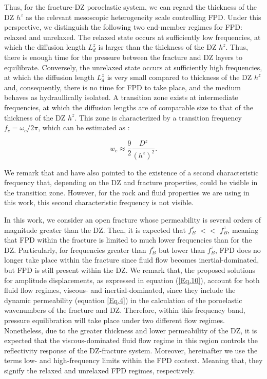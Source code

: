 \documentclass[draft]{agujournal2019}
\begin{document}
Thus, for the fracture-DZ poroelastic system, we can regard the thickness of the DZ $h^z$ as the relevant mesoscopic heterogeneity scale controlling FPD. Under this perspective, we  distinguish the following two end-member regimes for FPD: relaxed and unrelaxed. The relaxed state occurs at sufficiently low  frequencies, at which the diffusion length $L_d^z$ is larger than the thickness of the DZ $h^z$.
Thus, there is enough time for the pressure between the fracture and DZ layers to equilibrate. Conversely, the unrelaxed state occurs at sufficiently high frequencies, at which the diffusion length $L_d^z$ is very small compared to thickness of the DZ $h^z$ and, consequently, there is no time for FPD to take place, and the medium behaves as hydraullically isolated. A transition zone exists at intermediate frequencies, at which the diffusion lengths are of comparable size to that of the thickness of the DZ $h^z$. This zone is characterized by a transition frequency $f_c = \omega_c /2 \pi$, which can be estimated as \cite{Brajanovski2006, Muller2006}: 
\begin{linenomath*}
\begin{equation}\label{Eq.21}
   w_c \approx  \frac{9}{2} \frac{D^z}{(h^z)^2}.
\end{equation}
\end{linenomath*}
We remark that  and  have also pointed to the existence of a second characteristic frequency that, depending on the DZ and fracture properties, could be visible in the transition zone. However, 
for the rock and fluid properties we are using in this work, this second characteristic frequency is not visible.

In this work, we consider an open fracture whose permeability is several orders of magnitude greater than the DZ. Then, it is expected that $f_B^c$ $<<$ $f_B^z$, meaning that FPD within the fracture is limited to much lower frequencies than for the DZ. Particularly, for frequencies greater than $f_B^c$ but lower than $f_B^z$, FPD does no longer take place within the fracture since fluid flow becomes inertial-dominated, but FPD is still present within the DZ.  We remark that, the proposed solutions for amplitude displacements, as expressed in equation (\ref{Eq.10}), account for both fluid flow regimes, viscous- and inertial-dominated, since they include the dynamic permeability (equation \ref{Eq.4}) in the calculation of the poroelastic wavenumbers  of the fracture and DZ. Therefore,
within this frequency band, pressure equilibration will take place under two different flow regimes. Nonetheless, due to the greater thickness and lower permeability of the DZ, it is expected that the viscous-dominated fluid flow regime in this region controls the reflectivity response of the DZ-fracture system. 
Moreover, hereinafter we use the terms low- and high-frequency limits  within the FPD context. Meaning that, they signify the relaxed and unrelaxed FPD regimes, respectively.
\end{document}
